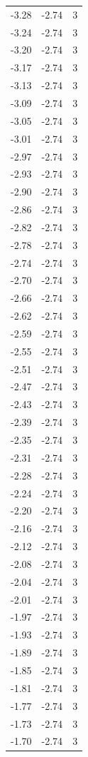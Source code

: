 \begin{longtable}{lrr}
  -3.28 & -2.74 & 3 \\
  -3.24 & -2.74 & 3 \\
  -3.20 & -2.74 & 3 \\
  -3.17 & -2.74 & 3 \\
  -3.13 & -2.74 & 3 \\
  -3.09 & -2.74 & 3 \\
  -3.05 & -2.74 & 3 \\
  -3.01 & -2.74 & 3 \\
  -2.97 & -2.74 & 3 \\
  -2.93 & -2.74 & 3 \\
  -2.90 & -2.74 & 3 \\
  -2.86 & -2.74 & 3 \\
  -2.82 & -2.74 & 3 \\
  -2.78 & -2.74 & 3 \\
  -2.74 & -2.74 & 3 \\
  -2.70 & -2.74 & 3 \\
  -2.66 & -2.74 & 3 \\
  -2.62 & -2.74 & 3 \\
  -2.59 & -2.74 & 3 \\
  -2.55 & -2.74 & 3 \\
  -2.51 & -2.74 & 3 \\
  -2.47 & -2.74 & 3 \\
  -2.43 & -2.74 & 3 \\
  -2.39 & -2.74 & 3 \\
  -2.35 & -2.74 & 3 \\
  -2.31 & -2.74 & 3 \\
  -2.28 & -2.74 & 3 \\
  -2.24 & -2.74 & 3 \\
  -2.20 & -2.74 & 3 \\
  -2.16 & -2.74 & 3 \\
  -2.12 & -2.74 & 3 \\
  -2.08 & -2.74 & 3 \\
  -2.04 & -2.74 & 3 \\
  -2.01 & -2.74 & 3 \\
  -1.97 & -2.74 & 3 \\
  -1.93 & -2.74 & 3 \\
  -1.89 & -2.74 & 3 \\
  -1.85 & -2.74 & 3 \\
  -1.81 & -2.74 & 3 \\
  -1.77 & -2.74 & 3 \\
  -1.73 & -2.74 & 3 \\
  -1.70 & -2.74 & 3 \\

\end{longtable}
